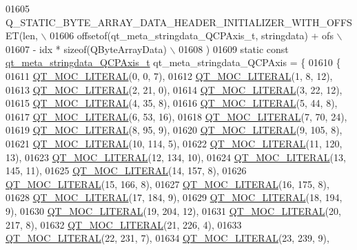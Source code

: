 \begin{DoxyCode}
01605 \textcolor{preprocessor}{    Q\_STATIC\_BYTE\_ARRAY\_DATA\_HEADER\_INITIALIZER\_WITH\_OFFSET(len, \(\backslash\)}
01606 \textcolor{preprocessor}{    offsetof(qt\_meta\_stringdata\_QCPAxis\_t, stringdata) + ofs \(\backslash\)}
01607 \textcolor{preprocessor}{        - idx * sizeof(QByteArrayData) \(\backslash\)}
01608 \textcolor{preprocessor}{    )}
01609 \textcolor{keyword}{static} \textcolor{keyword}{const} \hyperlink{a00016_d0/d61/a00100}{qt\_meta\_stringdata\_QCPAxis\_t} qt\_meta\_stringdata\_QCPAxis = \{
01610     \{
01611 \hyperlink{a00016_a75bb9482d242cde0a06c9dbdc6b83abe}{QT\_MOC\_LITERAL}(0, 0, 7),
01612 \hyperlink{a00016_a75bb9482d242cde0a06c9dbdc6b83abe}{QT\_MOC\_LITERAL}(1, 8, 12),
01613 \hyperlink{a00016_a75bb9482d242cde0a06c9dbdc6b83abe}{QT\_MOC\_LITERAL}(2, 21, 0),
01614 \hyperlink{a00016_a75bb9482d242cde0a06c9dbdc6b83abe}{QT\_MOC\_LITERAL}(3, 22, 12),
01615 \hyperlink{a00016_a75bb9482d242cde0a06c9dbdc6b83abe}{QT\_MOC\_LITERAL}(4, 35, 8),
01616 \hyperlink{a00016_a75bb9482d242cde0a06c9dbdc6b83abe}{QT\_MOC\_LITERAL}(5, 44, 8),
01617 \hyperlink{a00016_a75bb9482d242cde0a06c9dbdc6b83abe}{QT\_MOC\_LITERAL}(6, 53, 16),
01618 \hyperlink{a00016_a75bb9482d242cde0a06c9dbdc6b83abe}{QT\_MOC\_LITERAL}(7, 70, 24),
01619 \hyperlink{a00016_a75bb9482d242cde0a06c9dbdc6b83abe}{QT\_MOC\_LITERAL}(8, 95, 9),
01620 \hyperlink{a00016_a75bb9482d242cde0a06c9dbdc6b83abe}{QT\_MOC\_LITERAL}(9, 105, 8),
01621 \hyperlink{a00016_a75bb9482d242cde0a06c9dbdc6b83abe}{QT\_MOC\_LITERAL}(10, 114, 5),
01622 \hyperlink{a00016_a75bb9482d242cde0a06c9dbdc6b83abe}{QT\_MOC\_LITERAL}(11, 120, 13),
01623 \hyperlink{a00016_a75bb9482d242cde0a06c9dbdc6b83abe}{QT\_MOC\_LITERAL}(12, 134, 10),
01624 \hyperlink{a00016_a75bb9482d242cde0a06c9dbdc6b83abe}{QT\_MOC\_LITERAL}(13, 145, 11),
01625 \hyperlink{a00016_a75bb9482d242cde0a06c9dbdc6b83abe}{QT\_MOC\_LITERAL}(14, 157, 8),
01626 \hyperlink{a00016_a75bb9482d242cde0a06c9dbdc6b83abe}{QT\_MOC\_LITERAL}(15, 166, 8),
01627 \hyperlink{a00016_a75bb9482d242cde0a06c9dbdc6b83abe}{QT\_MOC\_LITERAL}(16, 175, 8),
01628 \hyperlink{a00016_a75bb9482d242cde0a06c9dbdc6b83abe}{QT\_MOC\_LITERAL}(17, 184, 9),
01629 \hyperlink{a00016_a75bb9482d242cde0a06c9dbdc6b83abe}{QT\_MOC\_LITERAL}(18, 194, 9),
01630 \hyperlink{a00016_a75bb9482d242cde0a06c9dbdc6b83abe}{QT\_MOC\_LITERAL}(19, 204, 12),
01631 \hyperlink{a00016_a75bb9482d242cde0a06c9dbdc6b83abe}{QT\_MOC\_LITERAL}(20, 217, 8),
01632 \hyperlink{a00016_a75bb9482d242cde0a06c9dbdc6b83abe}{QT\_MOC\_LITERAL}(21, 226, 4),
01633 \hyperlink{a00016_a75bb9482d242cde0a06c9dbdc6b83abe}{QT\_MOC\_LITERAL}(22, 231, 7),
01634 \hyperlink{a00016_a75bb9482d242cde0a06c9dbdc6b83abe}{QT\_MOC\_LITERAL}(23, 239, 9),

\end{DoxyCode}
